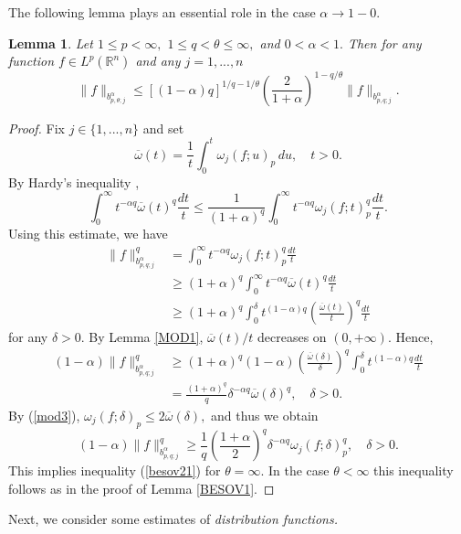 \documentclass[12pt,twoside,reqno]{amsart}
\numberwithin{equation}{section}
\newtheorem{lem}[teo]{Lemma}
\theoremstyle{definition}
\numberwithin{equation}{section}
\begin{document}
The following lemma plays an essential role in the case ${\alpha}\to 1-0.$
\begin{lem}\label{BESOV2} Let $1\le p<\infty,$  $1\le q<{\theta}\le\infty,$ and $0<{\alpha}<1.$ Then
for any function $f\in L^p({\mathbb R^n})$ and any $j=1,...,n$
\begin{equation}\label{besov21}
\|f\|_{b^{\alpha}_{p,{\theta};j}}\le
[(1-{\alpha})q]^{1/q-1/{\theta}}\left(\frac{2}{1+{\alpha}}\right)^{1-q/{\theta}}\|f\|_{b^{\alpha}_{p,q;j}}.
\end{equation}
\end{lem}
\begin{proof} Fix $j\in\{1,...,n\}$ and
 set
$$
\overline {\omega}(t)=\frac1t\int_0^t{\omega}_j(f;u)_p\,du,\quad t>0.
$$
By Hardy's inequality \cite[p. 124]{BS},
$$
\int_0^\infty t^{-{\alpha}
q}\overline{\omega}(t)^q\frac{dt}{t}\le\frac1{(1+{\alpha})^q}\int_0^\infty t^{-{\alpha}
q}{\omega}_j(f;t)_p^q\frac{dt}{t}.
$$
Using this estimate, we have
$$
\begin{aligned}
\|f\|_{b^{\alpha}_{p,q;j}}^q&=\int_0^\infty t^{-{\alpha} q}{\omega}_j(f;t)_p^q\frac{dt}{t}\\
&\ge (1+{\alpha})^q\int_0^\infty t^{-{\alpha}
q}\overline{\omega}(t)^q\frac{dt}{t}\\
&\ge (1+{\alpha})^q\int_0^{\delta} t^{(1-{\alpha})q}\left(\frac{\overline{\omega}(t)}{t}\right)^q\frac{dt}{t}
\end{aligned}
$$
for any ${\delta}>0.$ By Lemma \ref{MOD1}, $\overline{\omega}(t)/t$ decreases on
$(0,+\infty).$ Hence,
$$
\begin{aligned}
 (1-{\alpha})\|f\|_{b^{\alpha}_{p,q;j}}^q &\ge (1+{\alpha})^q(1-{\alpha})\left(\frac{\overline{\omega}({\delta})}{\delta}\right)^q\int_0^{\delta} t^{(1-{\alpha})q}\frac{dt}{t}\\
&=\frac{(1+{\alpha})^q}{q}{\delta}^{-{\alpha} q}\overline{\omega}({\delta})^q, \quad{\delta}>0.
\end{aligned}
$$
By (\ref{mod3}), ${\omega}_j(f;{\delta})_p\le 2\overline{\omega}({\delta}),$ and thus we
obtain
$$
(1-{\alpha})\|f\|_{b^{\alpha}_{p,q;j}}^q\ge\frac1q\left(\frac{1+{\alpha}}{2}\right)^q{\delta}^{-{\alpha}
q}{\omega}_j(f;{\delta})_p^q, \quad{\delta}>0.
$$
This implies inequality (\ref{besov21}) for ${\theta}=\infty.$ In the case ${\theta}<\infty$ this inequality follows as in the proof of Lemma \ref{BESOV1}.
\end{proof}

Next, we consider  some estimates of {\it distribution functions.}
\end{document}
